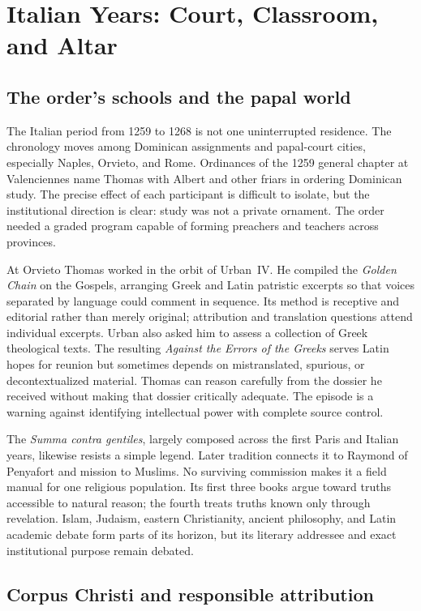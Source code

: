 \section{Italian Years: Court, Classroom, and Altar}

\subsection{The order's schools and the papal world}

The Italian period from 1259 to 1268 is not one uninterrupted residence.  The
chronology moves among Dominican assignments and papal-court cities, especially
Naples, Orvieto, and Rome.  Ordinances of the 1259 general chapter at
Valenciennes name Thomas with Albert and other friars in ordering Dominican
study.  The precise effect
of each participant is difficult to isolate, but the institutional direction
is clear: study was not a private ornament.  The order needed a graded program
capable of forming preachers and teachers across provinces.

At Orvieto Thomas worked in the orbit of Urban~IV.  He compiled the \emph{Golden
Chain} on the Gospels, arranging Greek and Latin patristic excerpts so that
voices separated by language could comment in sequence.  Its method is
receptive and editorial rather than merely original; attribution and
translation questions attend individual excerpts.  Urban also asked him to
assess a collection of Greek theological texts.  The resulting \emph{Against
the Errors of the Greeks} serves Latin hopes for reunion but sometimes depends
on mistranslated, spurious, or decontextualized material.  Thomas can reason
carefully from the dossier he received without making that dossier critically
adequate.  The episode is a warning against identifying intellectual power
with complete source control.

The \emph{Summa contra gentiles}, largely composed across the first Paris and
Italian years, likewise resists a simple legend.  Later tradition connects it
to Raymond of Penyafort and mission to Muslims.  No surviving commission makes
it a field manual for one religious population.  Its first three books argue
toward truths accessible to natural reason; the fourth treats truths known
only through revelation.  Islam, Judaism, eastern Christianity, ancient
philosophy, and Latin academic debate form parts of its horizon, but its
literary addressee and exact institutional purpose remain debated.

\subsection{Corpus Christi and responsible attribution}

